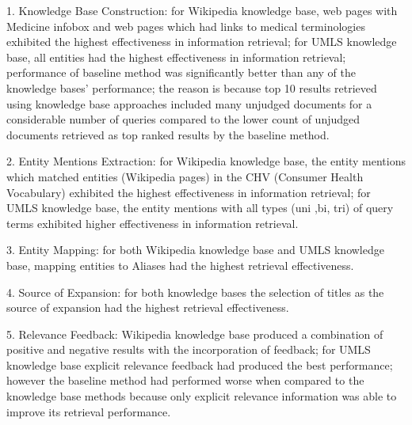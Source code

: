\documentclass[]{article}
\begin{document}
1. Knowledge Base Construction: for Wikipedia knowledge base, web pages with Medicine infobox and web pages which had links to medical terminologies exhibited the highest effectiveness in information retrieval; for UMLS knowledge base, all entities had the highest effectiveness in information retrieval; performance of baseline method was significantly better than any of the knowledge bases' performance; the reason is because top 10 results retrieved using knowledge base approaches included many unjudged documents for a considerable number of queries compared to the lower count of unjudged documents retrieved as top ranked results by the baseline method. 

2. Entity Mentions Extraction: for Wikipedia knowledge base, the entity mentions which matched entities (Wikipedia pages) in the CHV (Consumer Health Vocabulary) exhibited the highest effectiveness in information retrieval; for UMLS knowledge base, the entity mentions with all types (uni ,bi, tri) of query terms exhibited higher effectiveness in information retrieval.

3. Entity Mapping: for both Wikipedia knowledge base and UMLS knowledge base, mapping entities to Aliases had the highest retrieval effectiveness. 

4. Source of Expansion: for both knowledge bases the selection of titles as the source of expansion had the highest retrieval effectiveness. 

5. Relevance Feedback: Wikipedia knowledge base produced a combination of positive and negative results with the incorporation of feedback; for UMLS knowledge base explicit relevance feedback had produced the best performance; however the baseline method had performed worse when compared to the knowledge base methods because only explicit relevance information was able to improve its retrieval performance.  
\end{document}
